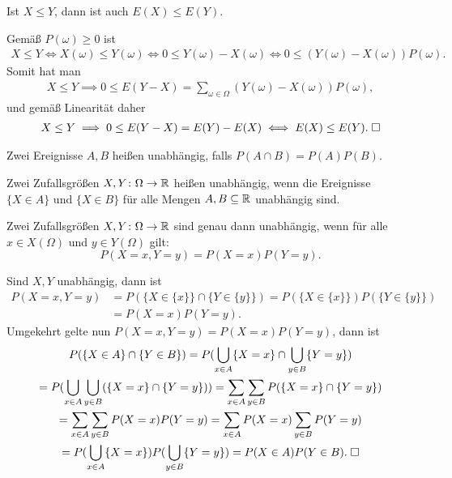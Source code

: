\begin{Satz} Ist $X\le Y$, dann ist auch $E(X)\le E(Y)$.
\end{Satz}
 Gemäß $P(\omega)\ge 0$ ist
\begin{gather*}
X\le Y\iff X(\omega)\le Y(\omega)\iff 0\le Y(\omega)-X(\omega)
\iff 0\le (Y(\omega)-X(\omega))P(\omega).
\end{gather*}
Somit hat man
\begin{gather*}
X\le Y\implies 0\le E(Y-X) = \sum_{\omega\in\Omega} (Y(\omega)-X(\omega))P(\omega),
\end{gather*}
und gemäß Linearität daher
\begin{gather*}
X\le Y\implies 0\le E(Y-X) = E(Y)-E(X) \iff E(X)\le E(Y).\;\square
\end{gather*}

\begin{Definition}%
\newlinefirst
Zwei Ereignisse $A,B$ heißen unabhängig, falls $P(A\cap B)=P(A)P(B)$.
\end{Definition}

\begin{Definition}%
\newlinefirst
Zwei Zufallsgrößen $X,Y\colon\Omega\to\mathbb R$ heißen unabhängig, wenn
die Ereignisse $\{X\in A\}$ und $\{X\in B\}$
für alle Mengen $A,B\subseteq\mathbb R$ unabhängig sind.
\end{Definition}

\begin{Satz}\label{rand-var-independence-char}
Zwei Zufallsgrößen $X,Y\colon\Omega\to\mathbb R$ sind genau dann unabhängig,
wenn für alle $x\in X(\Omega)$ und $y\in Y(\Omega)$ gilt:
\[P(X=x,Y=y)= P(X=x)P(Y=y).\]
\end{Satz}
 Sind $X,Y$ unabhängig, dann ist
\begin{align*}
P(X=x,Y=y) &= P(\{X\in\{x\}\}\cap\{Y\in\{y\}\})
= P(\{X\in\{x\}\})P(\{Y\in\{y\}\})\\
&= P(X=x)P(Y=y).
\end{align*}
Umgekehrt gelte nun $P(X=x,Y=y)=P(X=x)P(Y=y)$, dann ist
\begin{gather*}
P(\{X\in A\}\cap\{Y\in B\})
= P(\bigcup_{x\in A}\{X=x\}\cap\bigcup_{y\in B}\{Y=y\})\\
= P(\bigcup_{x\in A}\bigcup_{y\in B}(\{X=x\}\cap\{Y=y\}))
= \sum_{x\in A}\sum_{y\in B}P(\{X=x\}\cap\{Y=y\})\\
= \sum_{x\in A}\sum_{y\in B}P(X=x)P(Y=y)
= \sum_{x\in A}P(X=x)\sum_{y\in B}P(Y=y)\\
= P(\bigcup_{x\in A}\{X=x\})P(\bigcup_{y\in B}\{Y=y\})
= P(X\in A)P(Y\in B).\;\square
\end{gather*}

